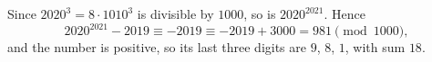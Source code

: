 Since $2020^3=8\cdot1010^3$ is divisible by $1000$, so is $2020^{2021}$. Hence
\[2020^{2021}-2019\equiv-2019\equiv-2019+3000=981\pmod{1000},\]
and the number is positive, so its last three digits are $9$, $8$, $1$, with sum $\boxed{18}$.
